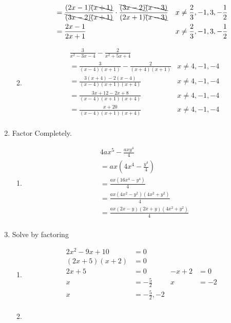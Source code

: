 \documentclass[paper=a4, fontsize=11pt]{scrartcl}
\begin{document}
\begin{enumerate}
\begin{enumerate}
\begin{align*}
            &=\frac{(2x-1)\bcancel{(x+1)}}{\bcancel{(3x-2)}\bcancel{(x+1)}}\cdot \frac{\bcancel{(3x-2)}\bcancel{(x-3)}}{(2x+1)\bcancel{(x-3)}}&x&\neq\frac{2}{3},-1,3,-\frac{1}{2}\\
            &=\frac{2x-1}{2x+1}&x&\neq\frac{2}{3},-1,3,-\frac{1}{2}\\
        \end{align*}
        \item \begin{align*}
            &\frac{3}{x^2-3x-4}-\frac{2}{x^2+5x+4}\\
            &=\frac{3}{(x-4)(x+1)}-\frac{2}{(x+4)(x+1)}&x\neq4,-1,-4\\
            &=\frac{3(x+4)-2(x-4)}{(x-4)(x+1)(x+4)}&x\neq4,-1,-4\\
            &=\frac{3x+12-2x+8}{(x-4)(x+1)(x+4)}&x\neq4,-1,-4\\
            &=\frac{x+20}{(x-4)(x+1)(x+4)}&x\neq4,-1,-4\\
        \end{align*}
    \end{enumerate}
    \item Factor Completely.
    \begin{enumerate}
        \item \begin{align*}
            &4ax^5-\frac{axy^4}{4}\\
            &=ax(4x^4-\frac{y^4}{4})\\
            &=\frac{ax(16x^4-y^4)}{4}\\
            &=\frac{ax(4x^2-y^2)(4x^2+y^2)}{4}\\
            &=\frac{ax(2x-y)(2x+y)(4x^2+y^2)}{4}\\
        \end{align*}
    \end{enumerate}
    \item Solve by factoring
    \begin{enumerate}
        \item \begin{align*}
            2x^2-9x+10&=0\\
            (2x+5)(x+2)&=0\\
            2x+5&=0&-x+2&=0\\
            x&=-\frac{5}{2}&x&=-2\\
            x&=-\frac{5}{2},-2\\
        \end{align*}
        \item \begin{align*}

\end{align*}
\end{enumerate}
\end{enumerate}
\end{document}

